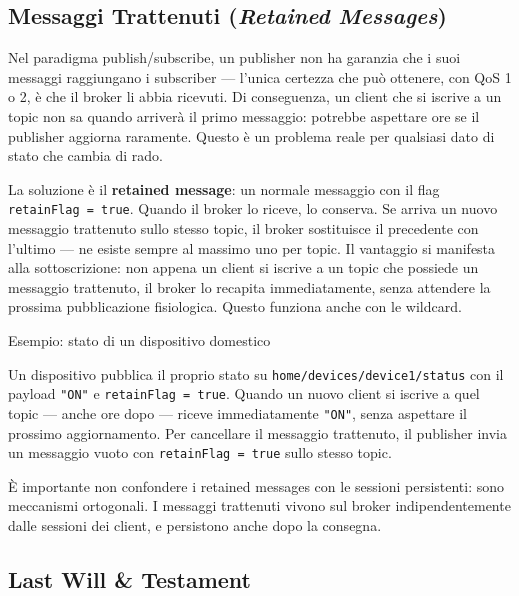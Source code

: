 \documentclass[
  italian,
  openany]{book}
\begin{document}
\subsection{\texorpdfstring{Messaggi Trattenuti (\emph{Retained
Messages})}{Messaggi Trattenuti (Retained Messages)}}\label{messaggi-trattenuti-retained-messages}

Nel paradigma publish/subscribe, un publisher non ha garanzia che i suoi
messaggi raggiungano i subscriber --- l'unica certezza che può ottenere,
con QoS 1 o 2, è che il broker li abbia ricevuti. Di conseguenza, un
client che si iscrive a un topic non sa quando arriverà il primo
messaggio: potrebbe aspettare ore se il publisher aggiorna raramente.
Questo è un problema reale per qualsiasi dato di stato che cambia di
rado.

La soluzione è il \textbf{retained message}: un normale messaggio con il
flag \texttt{retainFlag\ =\ true}. Quando il broker lo riceve, lo
conserva. Se arriva un nuovo messaggio trattenuto sullo stesso topic, il
broker sostituisce il precedente con l'ultimo --- ne esiste sempre al
massimo uno per topic. Il vantaggio si manifesta alla sottoscrizione:
non appena un client si iscrive a un topic che possiede un messaggio
trattenuto, il broker lo recapita immediatamente, senza attendere la
prossima pubblicazione fisiologica. Questo funziona anche con le
wildcard.

\begin{callouttip}{Esempio: stato di un dispositivo domestico}

Un dispositivo pubblica il proprio stato su
\texttt{home/devices/device1/status} con il payload \texttt{"ON"} e
\texttt{retainFlag\ =\ true}. Quando un nuovo client si iscrive a quel
topic --- anche ore dopo --- riceve immediatamente \texttt{"ON"}, senza
aspettare il prossimo aggiornamento. Per cancellare il messaggio
trattenuto, il publisher invia un messaggio vuoto con
\texttt{retainFlag\ =\ true} sullo stesso topic.

\end{callouttip}

È importante non confondere i retained messages con le sessioni
persistenti: sono meccanismi ortogonali. I messaggi trattenuti vivono
sul broker indipendentemente dalle sessioni dei client, e persistono
anche dopo la consegna.

\subsection{Last Will \& Testament}\label{last-will-testament}
\end{document}
